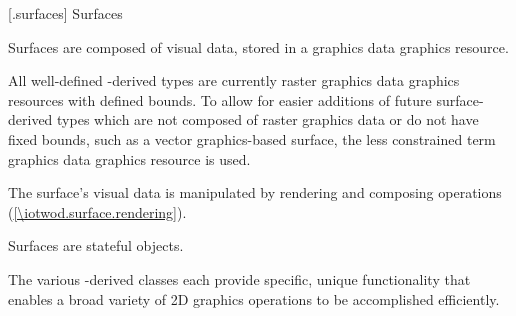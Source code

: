 
 [\iotwod.surfaces] {Surfaces}

\pnum
Surfaces are composed of visual data, stored in a graphics data graphics resource.
\begin{note}
All well-defined -derived types are currently raster graphics data graphics resources with defined bounds. To allow for easier additions of future surface-derived types which are not composed of raster graphics data or do not have fixed bounds, such as a vector graphics-based surface, the less constrained term graphics data graphics resource is used.
\end{note}

\pnum
The surface's visual data is manipulated by rendering and composing operations (\ref{\iotwod.surface.rendering}).

\pnum
Surfaces are stateful objects.

\pnum
The various -derived classes each provide specific, unique functionality that enables a broad variety of 2D graphics operations to be accomplished efficiently.

\addtocounter{SectionDepthBase}{1}



















\addtocounter{SectionDepthBase}{-1}
